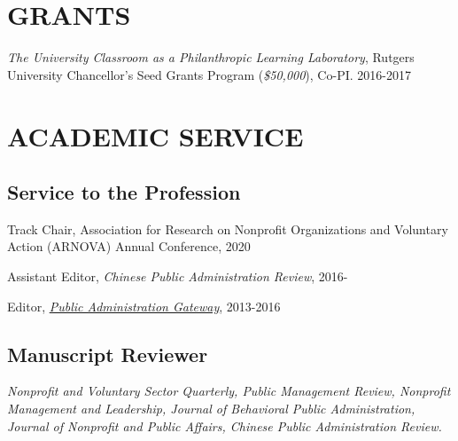 \documentclass[letterpaper]{article}
\renewenvironment{itemize}{
  \begin{list}{}{
    \setlength{\leftmargin}{1.5em}
  }
}{
  \end{list}
}
\begin{document}
\bigskip


\section*{GRANTS}
\begin{itemize}
	
\item {\it The University Classroom as a Philanthropic Learning Laboratory}, Rutgers University Chancellor's Seed Grants Program ({\it \$50,000}), Co-PI. 2016-2017

\end{itemize}

\bigskip

\section*{ACADEMIC SERVICE}
\subsection*{Service to the Profession}
\begin{itemize}
	
\item Track Chair, Association for Research on Nonprofit Organizations and Voluntary Action (ARNOVA) Annual Conference, 2020

\item Assistant Editor, {\it Chinese Public Administration Review}, 2016-

\item Editor, \href{https://pagateway.newark.rutgers.edu/}{\it Public Administration Gateway}, 2013-2016

\end{itemize}

\subsection*{Manuscript Reviewer}
\begin{itemize}
	
\item {\it Nonprofit and Voluntary Sector Quarterly, Public Management Review, Nonprofit Management and Leadership, Journal of Behavioral Public Administration, Journal of Nonprofit and Public Affairs, Chinese Public Administration Review.}

\end{itemize}

\bigskip
\end{document}
